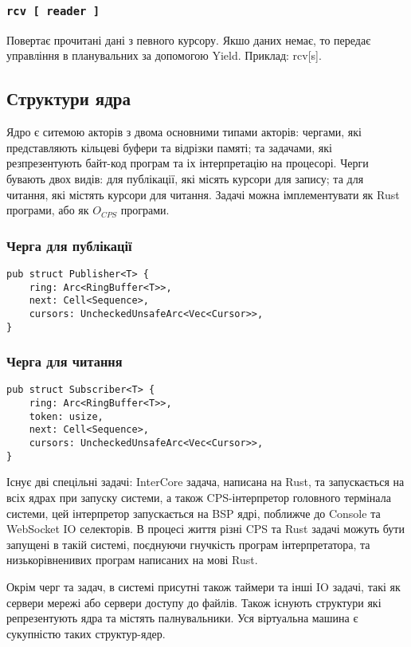 \begin{definition}
\begin{definition}
\begin{definition}
\begin{definition}
\subsubsection*{\lstinline{rcv [ reader ]}}
Повертає прочитані дані з певного курсору.
Якшо даних немає, то передає управління в планувальних за допомогою Yield.
Приклад: rcv[s].

\subsection{Структури ядра}
Ядро є ситемою акторів з двома основними типами акторів:
чергами, які представляють кільцеві буфери та відрізки памяті;
та задачами, які резпрезентують байт-код програм та іх інтерпретацію на процесорі.
Черги бувають двох видів: для публікації, які місять курсори для запису;
та для читання, які містять курсори для читання. Задачі можна імплементувати
як Rust програми, або як $O_{CPS}$ програми.

\subsubsection{Черга для публікації}
\begin{lstlisting}
pub struct Publisher<T> {
    ring: Arc<RingBuffer<T>>,
    next: Cell<Sequence>,
    cursors: UncheckedUnsafeArc<Vec<Cursor>>,
}
\end{lstlisting}

\subsubsection{Черга для читання}
\begin{lstlisting}
pub struct Subscriber<T> {
    ring: Arc<RingBuffer<T>>,
    token: usize,
    next: Cell<Sequence>,
    cursors: UncheckedUnsafeArc<Vec<Cursor>>,
}
\end{lstlisting}

Існує дві спецільні задачі: InterCore задача, написана на Rust,
та запускається на всіх ядрах при запуску системи, а також CPS-інтерпретор
головного термінала системи, цей інтерпретор запускається на BSP ядрі,
поближче до Console та WebSocket IO селекторів.
В процесі життя різні CPS та Rust задачі можуть бути запущені в такій системі,
поєднуючи гнучкість програм інтерпретатора, та низькорівненивих програм написаних на мові Rust.

Окрім черг та задач, в системі присутні також таймери та інші IO задачі,
такі як сервери мережі або сервери доступу до файлів. Також існують
структури які репрезентують ядра та містять палнувальники.
Уся віртуальна машина є сукупністю таких структур-ядер.


\end{definition}
\end{definition}
\end{definition}
\end{definition}
